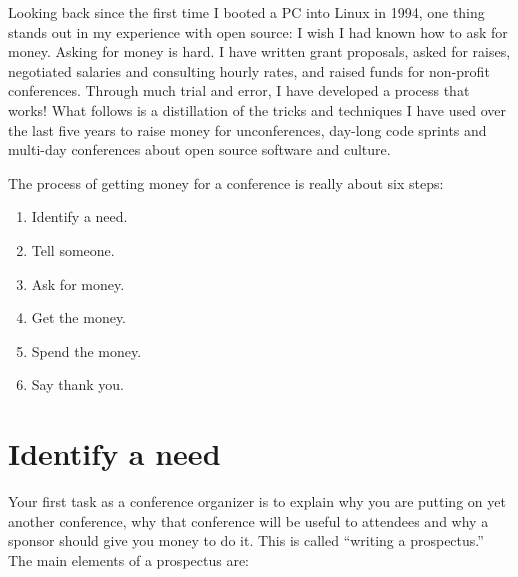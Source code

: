 

\noindent{}Looking back since the first time I booted a PC into Linux in 1994, one thing
stands out in my experience with open source: I wish I had known how to
ask for money.
Asking for money is hard. I have written grant proposals, asked for raises,
negotiated salaries and consulting hourly rates, and raised funds for non-profit
conferences. Through much trial and error, I have developed a process that
works!
What follows is a distillation of the tricks and techniques I have used over the
last five years to raise money for unconferences, day-long code sprints and
multi-day conferences about open source software and culture.

The process of getting money for a conference is really about six steps: 
\begin{enumerate}
 \item Identify a need. 
 \item Tell someone. 
 \item Ask for money.
 \item Get the money.
 \item Spend the money. 
 \item Say thank you.
\end{enumerate}

\section*{Identify a need}

Your first task as a conference organizer is to explain why you are putting on
yet another conference, why that conference will be useful to attendees and why
a sponsor should give you money to do it. This is called ``writing a
prospectus.''
The main elements of a prospectus are: 


